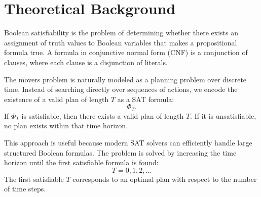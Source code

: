 \section{Theoretical Background} \label{sec:theoretical-background}
Boolean satisfiability is the problem of determining whether there exists an assignment of truth values to Boolean variables that makes a propositional formula true.
A formula in conjunctive normal form (CNF) is a conjunction of clauses, where each clause is a disjunction of literals.

\noindent The movers problem is naturally modeled as a planning problem over discrete time.
Instead of searching directly over sequences of actions, we encode the existence of a valid plan of length $T$ as a SAT formula:
\[
    \Phi_T.
\]
If $\Phi_T$ is satisfiable, then there exists a valid plan of length $T$.
If it is unsatisfiable, no plan exists within that time horizon.

\noindent This approach is useful because modern SAT solvers can efficiently handle large structured Boolean formulas.
The problem is solved by increasing the time horizon until the first satisfiable formula is found:
\[
    T = 0, 1, 2, \ldots
\]
The first satisfiable $T$ corresponds to an optimal plan with respect to the number of time steps.